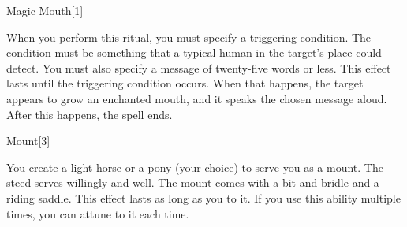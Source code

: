 \begin{spellsection}{Magic Mouth}[1]
\begin{spellcontent}
\begin{spelltargetinginfo}
\end{spelltargetinginfo}
\begin{spelleffects}
\spellspecial
When you perform this ritual, you must specify a triggering condition.
The condition must be something that a typical human in the target's place could detect.
You must also specify a message of twenty-five words or less.
\spelleffect
This effect lasts until the triggering condition occurs.
When that happens, the target appears to grow an enchanted mouth, and it speaks the chosen message aloud.
After this happens, the spell ends.
\end{spelleffects}
\end{spellcontent}
\begin{spellfooter}
\end{spellfooter}
\begin{spellsubcontent}
\end{spellsubcontent}
\end{spellsection}
\begin{spellsection}{Mount}[3]
\begin{spellcontent}
\begin{spelltargetinginfo}
\spellrng{\rngclose}
\end{spelltargetinginfo}
\begin{spelleffects}
\spelleffect
You create a light horse or a pony (your choice) to serve you as a mount.
The steed serves willingly and well.
The mount comes with a bit and bridle and a riding saddle.
This effect lasts as long as you  to it.
If you use this ability multiple times, you can attune to it each time.
\end{spelleffects}
\end{spellcontent}
\begin{spellfooter}
\end{spellfooter}
\begin{spellsubcontent}
\end{spellsubcontent}
\end{spellsection}
